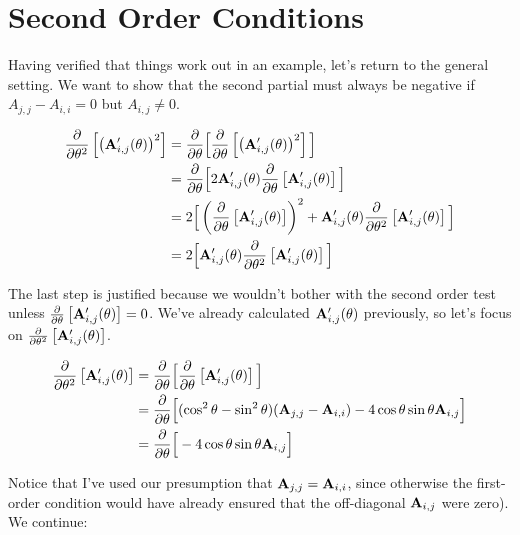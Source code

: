 \section{Second Order Conditions}

Having verified that things work out in an example, let's return to the
general setting. We want to show that the second partial must always be
negative if $A_{j, j} - A_{i, i} = 0$ but $A_{i, j} \ne 0$.

\begin{equation*}
  \begin{split}
      \frac{\partial }{\partial \theta^2} \left[ \left( \mathbf{A}'_{i, j}(\theta) \right)^2 \right]
    ={}&
      \frac{\partial }{\partial \theta} \Big[
        \frac{\partial }{\partial \theta} \left[ \left( \mathbf{A}'_{i, j}(\theta) \right)^2 \right]
      \Big] \\
    ={}&
      \frac{\partial }{\partial \theta} \Big[
        2
        \mathbf{A}'_{i, j}(\theta)
        \frac{\partial }{\partial \theta} \left[ \mathbf{A}'_{i, j}(\theta) \right]
      \Big] \\
    ={}&
      2 \Big[
        \left( \frac{\partial }{\partial \theta} \left[ \mathbf{A}'_{i, j}(\theta) \right] \right)^2
        +
        \mathbf{A}'_{i, j}(\theta)
        \frac{\partial }{\partial \theta^2} \left[ \mathbf{A}'_{i, j}(\theta) \right]
      \Big] \\
    ={}&
      2 \Big[
        \mathbf{A}'_{i, j}(\theta)
        \frac{\partial }{\partial \theta^2} \left[ \mathbf{A}'_{i, j}(\theta) \right]
      \Big]
  \end{split}
\end{equation*}

The last step is justified because we wouldn't bother with the second
order test unless $\frac{\partial }{\partial \theta} \left[ \mathbf{A}'_{i, j}(\theta) \right] = 0$.
We've already calculated $\mathbf{A}'_{i, j}(\theta)$ previously, so let's
focus on $\frac{\partial }{\partial \theta^2} \left[ \mathbf{A}'_{i, j}(\theta) \right]$.

\begin{equation*}
  \begin{split}
      \frac{\partial }{\partial \theta^2} \left[ \mathbf{A}'_{i, j}(\theta) \right]
    &=
      \frac{\partial }{\partial \theta} \Big[ \frac{\partial }{\partial \theta} \left[ \mathbf{A}'_{i, j}(\theta) \right] \Big] \\
    &=
      \frac{\partial }{\partial \theta} \Big[
        (\cos^2\theta - \sin^2\theta) (\mathbf{A}_{j, j} - \mathbf{A}_{i, i})
        - 4 \cos\theta\sin\theta \mathbf{A}_{i, j}
      \Big] \\
    &=
      \frac{\partial }{\partial \theta} \Big[
        -4\cos\theta\sin\theta \mathbf{A}_{i, j}
      \Big]
  \end{split}
\end{equation*}

Notice that I've used our presumption that $\mathbf{A}_{j, j} = \mathbf{A}_{i,
i}$, since otherwise the first-order condition would have already
ensured that the off-diagonal $\mathbf{A}_{i, j}$ were zero). We continue:

